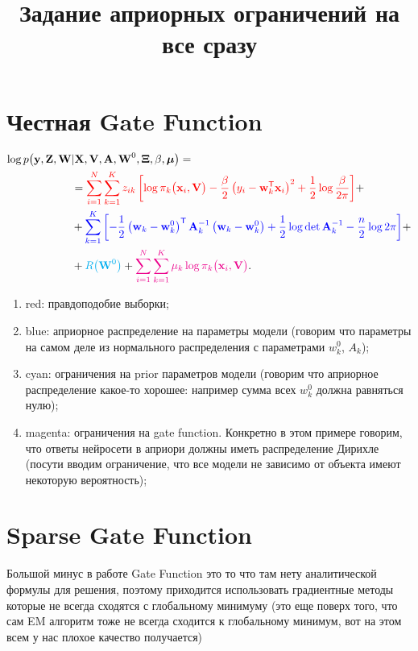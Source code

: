 \documentclass[12pt, twoside]{article}
\numberwithin{equation}{section}
\begin{document}
\title{\bf Задание априорных ограничений на все сразу}
\date{}
\author{}
\maketitle

\section{Честная Gate Function}
\[
\label{eq:em:2}
\begin{aligned}
\log p\bigr(\mathbf{y}, \mathbf{Z}, \mathbf{W}&|\mathbf{X}, \mathbf{V}, \textbf{A}, \textbf{W}^{0},  \bm{\Xi}, \beta, \bm{\mu}\bigr) =\\
&= {\color{red}\sum_{i=1}^{N}\sum_{k=1}^{K}z_{ik}\left[\log\pi_k\bigr(\textbf{x}_i, \textbf{V}\bigr) - \frac{\beta}{2}\left(y_{i} - \textbf{w}_{k}^{\mathsf{T}}\textbf{x}_{i}\right)^{2} + \frac{1}{2}\log\frac{\beta}{2\pi}\right]} +\\
&+ {\color{blue}\sum_{k=1}^{K}\left[-\frac{1}{2}\left(\textbf{w}_{k} - \textbf{w}_{k}^{0}\right)^{\mathsf{T}}\textbf{A}_{k}^{-1}\left(\textbf{w}_{k} - \textbf{w}_{k}^{0}\right) + \frac{1}{2}\log\det\textbf{A}^{-1}_{k} - \frac{n}{2}\log2\pi\right]}+\\
&+{\color{cyan}R\bigr(\textbf{W}^0\bigr)} + {\color{magenta}\sum_{i=1}^{N}\sum_{k=1}^{K}\mu_k\log\pi_k\bigr(\textbf{x}_i, \textbf{V}\bigr)}.
\end{aligned}
\]

\begin{enumerate}
	\item {\color{red}red}: правдоподобие выборки;
	\item {\color{blue}blue}: априорное распределение на параметры модели (говорим что параметры на самом деле из нормального распределения с параметрами $w_k^0$, $A_k$);
	\item {\color{cyan}cyan}: ограничения на prior параметров модели (говорим что априорное распределение  какое-то хорошее: например сумма всех $w_k^0$ должна равняться нулю);
	\item {\color{magenta}magenta}: ограничения на gate function. Конкретно в этом примере говорим, что ответы нейросети в априори должны иметь распределение Дирихле (посути вводим ограничение, что все модели не зависимо от объекта имеют некоторую вероятность);
\end{enumerate}

\section{Sparse Gate Function}
Большой минус в работе Gate Function это то что там нету аналитической формулы для решения, поэтому приходится использовать градиентные методы которые не всегда сходятся с глобальному минимуму (это еще поверх того, что сам EM алгоритм тоже не всегда сходится к глобальному минимум, вот на этом всем у нас плохое качество получается)
\end{document}
